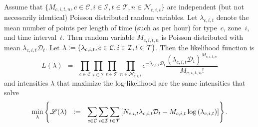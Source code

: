 \documentclass[article]{jss}
\def\defi{\vcentcolon=}
\begin{document}
Assume that $\big\{M_{c,i,t,n}, c \in \mathcal{C}, i \in \mathcal{I}, t \in \mathcal{T}, n \in \mathcal{N}_{c,i,t}\big\}$ are independent (but not necessarily identical) Poisson distributed random variables.
Let $\lambda_{c,i,t}$ denote the mean number of points per length of time (such as per hour) for type~$c$,
zone~$i$, and time interval~$t$.
Then random variable $M_{c,i,t,n}$ is Poisson distributed with mean $\lambda_{c,i,t} \mathcal{D}_{t}$.
Let $\lambda \defi \big(\lambda_{c,i,t}, c \in \mathcal{C}, i \in \mathcal{I}, t \in \mathcal{T}\big)$.
Then the likelihood function is
\[
L(\lambda) \ \ = \ \ \prod_{c \in \mathcal{C}} \prod_{i \in \mathcal{I}} \prod_{t \in \mathcal{T}} \prod_{n \in \mathcal{N}_{c,i,t}} e^{-\lambda_{c,i,t} \mathcal{D}_{t}} \frac{(\lambda_{c,i,t}\mathcal{D}_{t})^{M_{c,i,t,n}}}{M_{c,i,t,n}!}
\]
and intensities $\lambda$ that maximize the log-likelihood are the same intensities that solve
\begin{equation}
\label{eqn:maxlikelihood1}
\min_{\lambda} \left\{\mathscr{L}(\lambda) \ \ \defi \ \ \sum_{c \in \mathcal{C}} \sum_{i \in \mathcal{I}} \sum_{t \in \mathcal{T}} \left[N_{c,i,t} \lambda_{c,i,t}\mathcal{D}_{t} - M_{c,i,t} \log\left(\lambda_{c,i,t}\right)\right]\right\}.
\end{equation}
\end{document}
